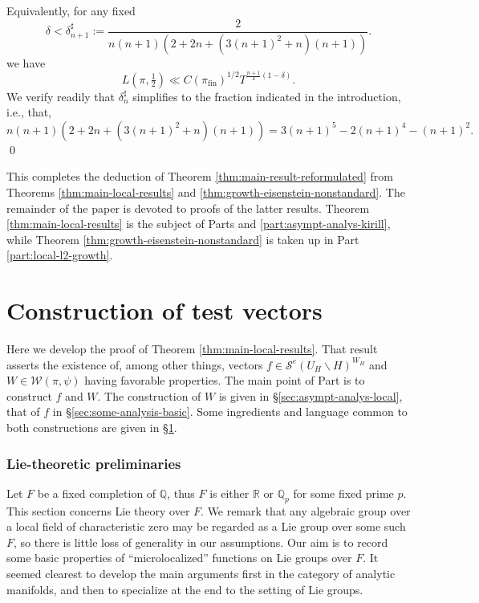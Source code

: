 \documentclass[reqno]{amsart}
\DeclareMathOperator{\fin}{fin}
\theoremstyle{plain} \newtheorem{theorem} {Theorem}
\theoremstyle{definition} \newtheorem{definition} [theorem] {Definition}
\theoremstyle{itplain} %
\numberwithin{equation}{section}
\numberwithin{theorem}{section}
\begin{document}
Equivalently, for any fixed
\begin{equation*}
  \delta < \delta_{n+1} ^\sharp  := \frac{2}{n(n+1) (2 + 2 n + (3 (n+1)^2 + n)(n+1))}.
\end{equation*}
we have
\begin{equation*}
  L(\pi,\tfrac{1}{2}) \ll C(\pi_{\fin})^{1/2} T^{\frac{n+1}{4}(1 - \delta)}.
\end{equation*}
We verify readily that $\delta_n ^\sharp$ simplifies to the fraction indicated in the introduction, i.e., that,
\begin{equation*}
  n(n+1) (2 + 2 n + (3 (n+1)^2 + n)(n+1))
  = 3 ( n+1)^5 - 2 (n+1)^4 - (n+1)^2.
\end{equation*}
\qed

This completes the deduction of Theorem \ref{thm:main-result-reformulated} from Theorems \ref{thm:main-local-results} and \ref{thm:growth-eisenstein-nonstandard}.  The remainder of the paper is devoted to proofs of the latter results.  Theorem \ref{thm:main-local-results} is the subject of Parts \ref{part:constr-test-vect} and \ref{part:asympt-analys-kirill}, while Theorem \ref{thm:growth-eisenstein-nonstandard} is taken up in Part \ref{part:local-l2-growth}.








\part{Construction of test vectors}\label{part:constr-test-vect}

Here we develop the proof of Theorem \ref{thm:main-local-results}.  That result asserts the existence of, among other things, vectors $f \in \mathcal{S}^e(U_H \backslash H)^{W_H}$ and $W \in \mathcal{W}(\pi,\psi)$ having favorable properties.  The main point of Part \ref{part:constr-test-vect} is to construct $f$ and $W$.  The construction of $W$ is given in \S\ref{sec:asympt-analys-local}, that of $f$ in \S\ref{sec:some-analysis-basic}.  Some ingredients and language common to both constructions are given in \S\ref{sec:modul-bump-funct}.

\section{Lie-theoretic preliminaries}\label{sec:modul-bump-funct}

Let $F$ be a fixed completion of $\mathbb{Q}$, thus $F$ is either $\mathbb{R}$ or $\mathbb{Q}_p$ for some fixed prime $p$.  This section concerns Lie theory over $F$.  We remark that any algebraic group over a local field of characteristic zero may be regarded as a Lie group over some such $F$, so there is little loss of generality in our assumptions.  Our aim is to record some basic properties of ``microlocalized'' functions on Lie groups over $F$.   It seemed clearest to develop the main arguments first in the category of analytic manifolds, and then to specialize at the end to the setting of Lie groups.
\end{document}
